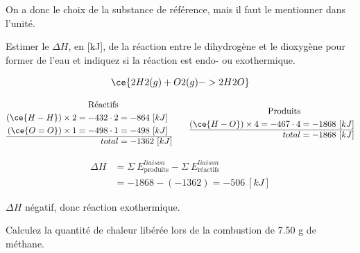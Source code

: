 \documentclass[
  11pt,
  a4paper,
  openany]{book}
\begin{document}
On a donc le choix de la substance de référence, mais il faut le mentionner dans l'unité.

\clearpage

\begin{Exercise}

Estimer le \(\Delta H\), en {[}kJ{]}, de la réaction entre le dihydrogène et le dioxygène pour former de l'eau et indiquez si la réaction est endo- ou exothermique.


\end{Exercise}

\begin{Answer}
\[
\ce{2 H2(g) + O2(g) -> 2 H2O}
\]

\[
\begin{split}
  \text{Réactifs}& \\
  (\ce{H-H}) \times 2 = -432 \cdot 2 &= -864\ [kJ] \\
  (\ce{O=O}) \times 1 = -498 \cdot 1 &= -498\ [kJ] \\
  \hline
  total &= -1362\ [kJ]
\end{split}
\qquad
\begin{split}
  \text{Produits}& \\
  (\ce{H-O}) \times 4 = -467 \cdot 4 &= -1868\ [kJ] \\
  \hline
  total &= -1868\ [kJ]
\end{split}
\]

\[
\begin{split}
\Delta H &= \Sigma\ E^{liaison}_{\text{produits}} - \Sigma\ E^{liaison}_{\text{réactifs}} \\
  &= -1868-(-1362) = -506\ [kJ]
\end{split}
\]

\(\Delta H\) négatif, donc réaction exothermique.

\end{Answer}

\begin{Exercise}

Calculez la quantité de chaleur libérée lors de la combustion de 7.50 g de méthane.


\end{Exercise}
\end{document}
